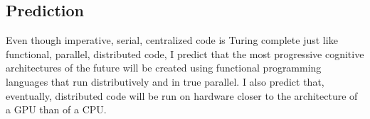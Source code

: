 \documentclass[a4paper]{article}
\begin{document}
    \subsection{Prediction}

        Even though imperative, serial, centralized code is Turing complete just like functional, parallel, distributed code, I predict that the most progressive cognitive architectures of the future will be created using functional programming languages that run distributively and in true parallel. 
        I also predict that, eventually, distributed code will be run on hardware closer to the architecture of a GPU than of a CPU.

\printbibliography
\end{document}
